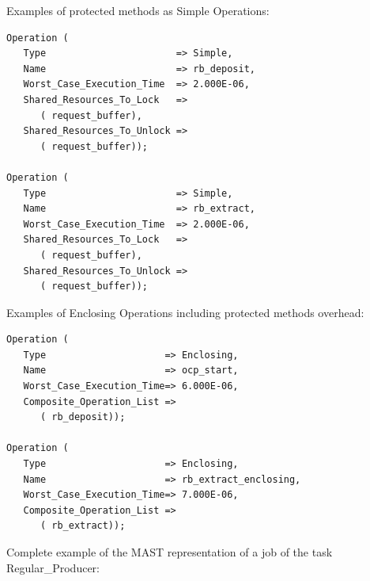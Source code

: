 \documentclass{article}
\begin{document}
Examples of protected methods as Simple Operations:

\begin{lstlisting}
Operation (
   Type                       => Simple,
   Name                       => rb_deposit,
   Worst_Case_Execution_Time  => 2.000E-06,
   Shared_Resources_To_Lock   =>
      ( request_buffer),
   Shared_Resources_To_Unlock =>
      ( request_buffer));

Operation (
   Type                       => Simple,
   Name                       => rb_extract,
   Worst_Case_Execution_Time  => 2.000E-06,
   Shared_Resources_To_Lock   =>
      ( request_buffer),
   Shared_Resources_To_Unlock =>
      ( request_buffer));
\end{lstlisting}

Examples of Enclosing Operations including protected methods overhead:

\begin{lstlisting}
Operation (
   Type                     => Enclosing,
   Name                     => ocp_start,
   Worst_Case_Execution_Time=> 6.000E-06,
   Composite_Operation_List =>
      ( rb_deposit));

Operation (
   Type                     => Enclosing,
   Name                     => rb_extract_enclosing,
   Worst_Case_Execution_Time=> 7.000E-06,
   Composite_Operation_List =>
      ( rb_extract));
\end{lstlisting}

Complete example of the MAST representation of a job of the task Regular\_Producer:
\end{document}
